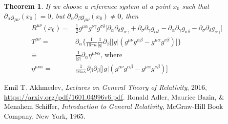 \documentclass[]{article}
\newtheorem{theorem}{Theorem}
\begin{document}
\begin{theorem}
	If we choose a reference system at a point $x_0$ such that $\partial_{\alpha}g_{\mu\nu}(x_0)=0$, but $\partial_{\alpha}\partial_{\beta}g_{\mu\nu}(x_0)\neq0$, then
	\begin{align*}
	R^{\mu\nu}(x_0) = & \frac{1}{2}g^{\mu\alpha}g^{\nu\gamma}g^{\sigma\delta}\big[\partial_{\alpha}\partial_{\delta}g_{\sigma\gamma} + \partial_{\sigma}\partial_{\gamma}g_{\alpha\delta} - \partial_{\alpha}\partial_{\gamma}g_{\sigma\delta} - \partial_{\sigma}\partial_{\delta}g_{\alpha\gamma}\big]\\
	T^{\mu\nu} =& \partial_{\alpha}\bigg\{ \frac{1}{16\pi\kappa}\frac{1}{|g|}\partial_{\beta}\big[|g|(g^{\mu\nu}g^{\alpha\beta}-g^{\mu\alpha}g^{\nu\beta})\big]\bigg\}\\
	\equiv& \frac{1}{|g|}\partial_{\alpha}\eta^{\mu\nu\alpha} \text{, where}\\
	\eta^{\mu\nu\alpha} =& \frac{1}{16\pi\kappa} \partial_{\beta} \partial_{\beta}\big[|g|(g^{\mu\nu}g^{\alpha\beta}-g^{\mu\alpha}g^{\nu\beta})\big]
	\end{align*}
\end{theorem}



\begin{thebibliography}{9}
	
	Emil T. Akhmedev,
	\emph{Lectures on General Theory of Relativity},
	2016,
	\url{https://arxiv.org/pdf/1601.04996v6.pdf}.
	Ronald Adler, Maurice Bazin, \& Menahem Schiffer,
	\emph{Introduction to General Relativity},
	McGraw-Hill Book Company, New York,
	1965.
	
	
\end{thebibliography}
\end{document}
